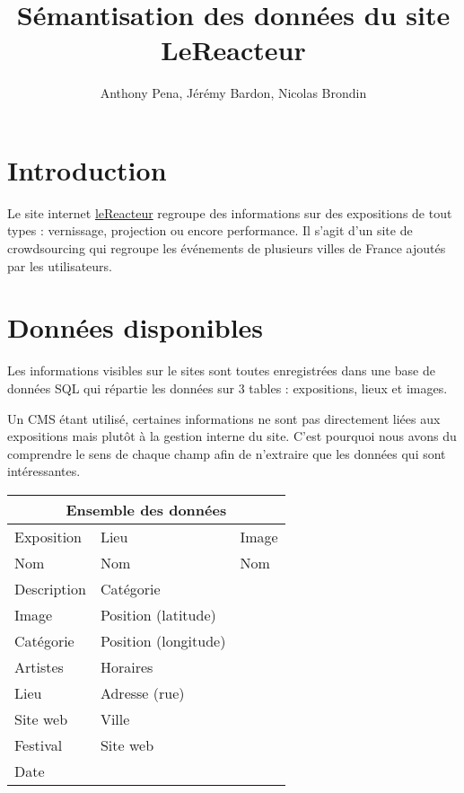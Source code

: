 \documentclass[12pt,a4paper]{article}
\title{Sémantisation des données du site LeReacteur}
\author{Anthony Pena, Jérémy Bardon, Nicolas Brondin}
\date{}
\begin{document}
	\renewcommand{\contentsname}{Sommaire}

	\maketitle

	\newpage
	\tableofcontents
	\newpage
	
	\section{Introduction}
	Le site internet \href{http://lereacteur.info}{leReacteur} regroupe des informations sur des expositions de tout types : vernissage, projection ou encore performance. Il s'agit d'un site de crowdsourcing qui regroupe les événements de plusieurs villes de France ajoutés par les utilisateurs.
	
	\section{Données disponibles}	
	Les informations visibles sur le sites sont toutes enregistrées dans une base de données SQL qui répartie les données sur 3 tables : expositions, lieux et images. 
	
	Un CMS étant utilisé, certaines informations ne sont pas directement liées aux expositions mais plutôt à la gestion interne du site. C'est pourquoi nous avons du comprendre le sens de chaque champ afin de n'extraire que les données qui sont intéressantes.
	
	\begin{center}
	\begin{tabular}{|l|l|l|}
		\hline
		\multicolumn{3}{|c|}{Ensemble des données} \\
		\hline
		Exposition & Lieu & Image \\
		\hline
		Nom & Nom & Nom \\
		Description & Catégorie &\\
		Image & Position (latitude) &\\
		Catégorie & Position (longitude) &\\
		Artistes & Horaires &\\
		Lieu & Adresse (rue) &\\
		Site web & Ville &\\
		Festival & Site web &\\
		Date &&\\    		
		\hline
	\end{tabular}
	\end{center}
	
\end{document}

